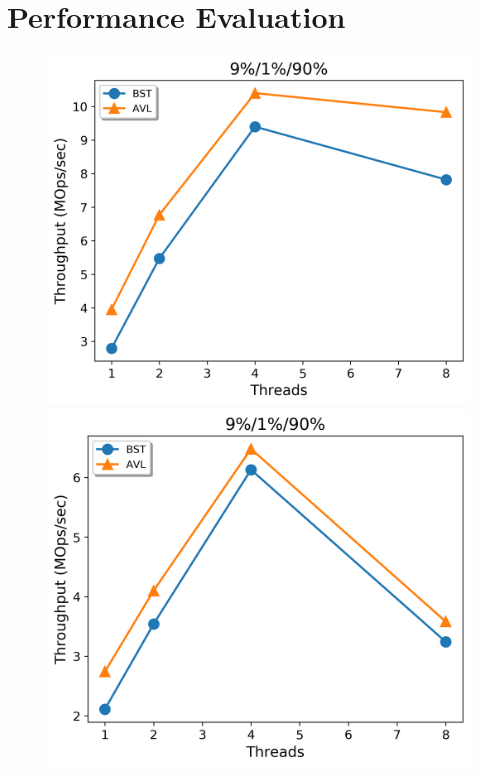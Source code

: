 \documentclass[conference]{IEEEtran}
\theoremstyle{definition}
\theoremstyle{theorem}
\begin{document}
\section{Performance Evaluation}
\begin{figure}[t]
 \centering
\begin{minipage}{0.33\textwidth}
	\centering
 {\includegraphics[width =1\linewidth]{figures/conc-9-1-90.png}}
 {\includegraphics[width =1\linewidth]{figures/stm1-9-1-90.png}}

\end{minipage}
\end{figure}
\end{document}
